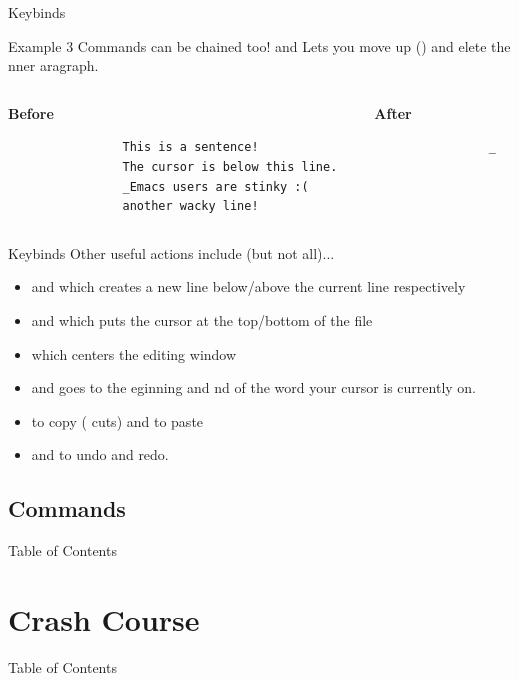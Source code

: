 \documentclass{beamer}
\begin{document}
\begin{frame}[fragile]{Keybinds}
	\begin{exampleblock}{Example 3}
		Commands can be chained too!
		 and  Lets you move  up ()
		and elete the nner
		aragraph.\footnotemark
		\pause

		\bigskip

		\begin{columns}
			\begin{column}{0.5\textwidth}
				\textbf{Before}
				\begin{verbatim}
				This is a sentence!
				The cursor is below this line.
				_Emacs users are stinky :(
				another wacky line!
				\end{verbatim}
			\end{column}
			\begin{column}{0.5\textwidth}
				\textbf{After}
				\begin{verbatim}
				_



				\end{verbatim}
			\end{column}
		\end{columns}
	\end{exampleblock}

\end{frame}

\begin{frame}{Keybinds}
	Other useful actions include (but not all)...
	\pause

	\begin{itemize}
		\item {} and  which creates a new line below/above
			the current line respectively

		\item {} and  which puts the cursor at the
			top/bottom of the file

		\item {} which centers the editing window

		\item {} and  goes to the eginning and
			nd of the word your cursor is currently on.

		\item {} to copy ( cuts) and  to paste

		\item {} and  to undo and redo.
	\end{itemize}
\end{frame}

\subsection{Commands}
\begin{frame}{Table of Contents}
	\tableofcontents[currentsubsection]
\end{frame}

\section{Crash Course}
\begin{frame}{Table of Contents}
	\tableofcontents[currentsection]
\end{frame}
\end{document}
